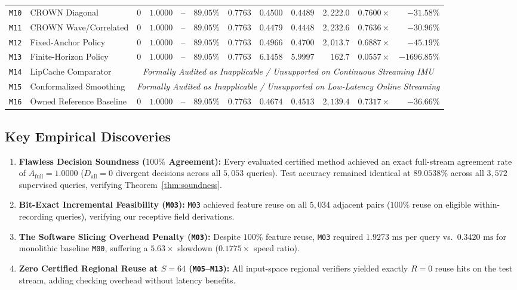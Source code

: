 \documentclass[journal,onecolumn,10pt]{IEEEtran}
\newcommand{\code}[1]{{\small\ttfamily\nolinkurl{#1}}}
\theoremstyle{remark}
\begin{document}
\begin{table}[!htbp]
{\begin{tabular}{@{}llrrrrrrrrrr@{}}
\code{M10} & CROWN Diagonal & $0$ & $1.0000$ & -- & $89.05\%$ & $0.7763$ & $0.4500$ & $0.4489$ & $2,222.0$ & $0.7600\times$ & $-31.58\%$ \\
\code{M11} & CROWN Wave/Correlated & $0$ & $1.0000$ & -- & $89.05\%$ & $0.7763$ & $0.4479$ & $0.4448$ & $2,232.6$ & $0.7636\times$ & $-30.96\%$ \\
\code{M12} & Fixed-Anchor Policy & $0$ & $1.0000$ & -- & $89.05\%$ & $0.7763$ & $0.4966$ & $0.4700$ & $2,013.7$ & $0.6887\times$ & $-45.19\%$ \\
\code{M13} & Finite-Horizon Policy & $0$ & $1.0000$ & -- & $89.05\%$ & $0.7763$ & $6.1458$ & $5.9997$ & $162.7$ & $0.0557\times$ & $-1696.85\%$ \\
\code{M14} & LipCache Comparator & \multicolumn{10}{c}{\textit{Formally Audited as Inapplicable / Unsupported on Continuous Streaming IMU}} \\
\code{M15} & Conformalized Smoothing & \multicolumn{10}{c}{\textit{Formally Audited as Inapplicable / Unsupported on Low-Latency Online Streaming}} \\
\code{M16} & Owned Reference Baseline & $0$ & $1.0000$ & -- & $89.05\%$ & $0.7763$ & $0.4674$ & $0.4513$ & $2,139.4$ & $0.7317\times$ & $-36.66\%$ \\
\bottomrule
\end{tabular}%
}
\end{table}

\subsection{Key Empirical Discoveries}
\begin{enumerate}[leftmargin=1.4em]
  \item \textbf{Flawless Decision Soundness ($100\%$ Agreement):} Every evaluated certified method achieved an exact full-stream agreement rate of $A_{\text{full}} = 1.0000$ ($D_{\text{all}} = 0$ divergent decisions across all $5,053$ queries). Test accuracy remained identical at $89.0538\%$ across all $3,572$ supervised queries, verifying Theorem~\ref{thm:soundness}.
  \item \textbf{Bit-Exact Incremental Feasibility (\code{M03}):} \code{M03} achieved feature reuse on all $5,034$ adjacent pairs ($100\%$ reuse on eligible within-recording queries), verifying our receptive field derivations.
  \item \textbf{The Software Slicing Overhead Penalty (\code{M03}):} Despite $100\%$ feature reuse, \code{M03} required $1.9273\text{ ms}$ per query vs.\ $0.3420\text{ ms}$ for monolithic baseline \code{M00}, suffering a $5.63\times$ slowdown ($0.1775\times$ speed ratio).
  \item \textbf{Zero Certified Regional Reuse at $S=64$ (\code{M05}--\code{M13}):} All input-space regional verifiers yielded exactly $R = 0$ reuse hits on the test stream, adding checking overhead without latency benefits.
\end{enumerate}
\end{document}
